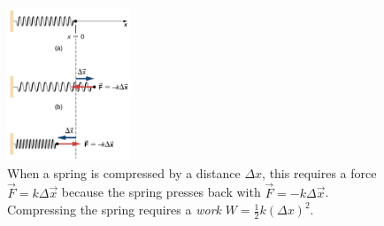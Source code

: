 \documentclass{article}
\begin{document}
\begin{figure}
\centering
\includegraphics[width=0.33\textwidth]{springWork.png}
\caption{\label{fig:work} When a spring is compressed by a distance $\Delta x$, this requires a force $\vec{F} = k\Delta \vec{x}$ because the spring presses back with $\vec{F} = -k\Delta \vec{x}$.  Compressing the spring requires a \textit{work} $W = \frac{1}{2} k (\Delta x)^2$.}
\end{figure}
\end{document}
